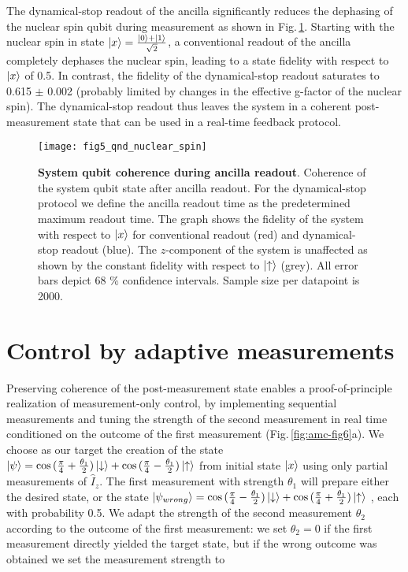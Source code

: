 The dynamical-stop readout of the ancilla significantly reduces the dephasing of the nuclear spin qubit during measurement as shown in Fig.\,\ref{fig:amc-fig5}. Starting with the nuclear spin in state $\left|x\right> = \frac{\left|0\right> + \left|1\right>}{\sqrt{2}}$, a conventional readout of the ancilla completely dephases the nuclear spin, leading to a state fidelity with respect to $\left|x\right>$ of 0.5. In contrast, the fidelity of the dynamical-stop readout saturates to 0.615 $\pm$ 0.002 (probably limited by changes in the effective g-factor of the nuclear spin). The dynamical-stop readout thus leaves the system in a coherent post-measurement state that can be used in a real-time feedback protocol. 

\begin{figure*}
	\centering
	\texttt{[image: fig5\_qnd\_nuclear\_spin]}
	\caption{\label{fig:amc-fig5} \textbf{System qubit coherence during ancilla readout}. Coherence of the system qubit state after ancilla readout. For the dynamical-stop protocol we define the ancilla readout time as the predetermined maximum readout time. The graph shows the fidelity of the system with respect to $\left|x\right>$ for conventional readout (red) and dynamical-stop readout (blue). The $z$-component of the system is unaffected as shown by the constant fidelity with respect to $\left|\uparrow\right>$ (grey). All error bars depict 68 $\%$ confidence intervals. Sample size per datapoint is 2000. }
\end{figure*}

\section{Control by adaptive measurements}
Preserving coherence of the post-measurement state enables a proof-of-principle realization of measurement-only control, by implementing sequential measurements and tuning the strength of the second measurement in real time conditioned on the outcome of the first measurement (Fig.\,\ref{fig:amc-fig6}a). We choose as our target the creation of the state $\left|\psi\right> = \cos{(\frac{\pi}{4}+\frac{\theta_1}{2})}\left|\downarrow\right>+\cos{(\frac{\pi}{4}-\frac{\theta_1}{2})}\left|\uparrow\right>$ from initial state $\left|x\right>$ using only partial measurements of $\hat{I}_z$. The first measurement with strength $\theta_1$ will prepare either the desired state, or the state $\left|\psi_{wrong}\right> =  \cos{(\frac{\pi}{4}-\frac{\theta_1}{2})}\left|\downarrow\right>+\cos{(\frac{\pi}{4}+\frac{\theta_1}{2})}\left|\uparrow\right>$ , each with probability 0.5. We adapt the strength of the second measurement $\theta_2$ according to the outcome of the first measurement: we set $\theta_2 = 0$ if the first measurement directly yielded the target state, but if the wrong outcome was obtained we set the measurement strength to

